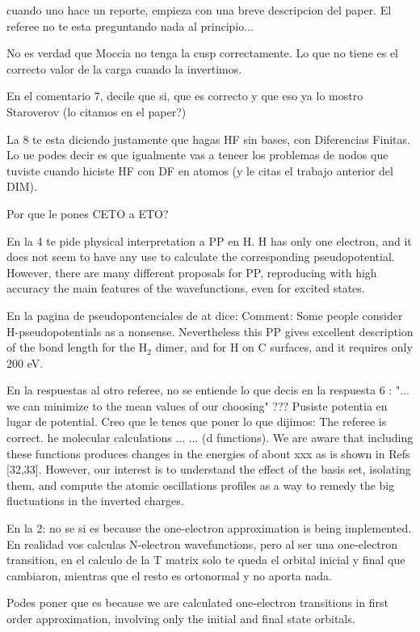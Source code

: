 cuando uno hace un reporte, empieza con una breve descripcion del paper.
El referee no te esta preguntando nada al principio...

No es verdad que Moccia no tenga la cusp correctamente.
Lo que no tiene es el correcto valor de la carga cuando la invertimos.

En el comentario 7, decile que si, que es correcto y que eso ya lo
mostro Staroverov (lo citamos en el paper?)

La 8 te esta diciendo justamente que hagas HF sin bases,
con Diferencias Finitas. Lo ue podes decir es que igualmente
vas a teneer los problemas de nodos que tuviste cuando hiciste
HF con DF en atomos (y le citas el trabajo anterior del DIM).

Por que le pones CETO a ETO?

En la 4 te pide physical interpretation a PP en H.
H has only one electron, and it does not seem to have any use to
calculate the corresponding pseudopotential.
However, there are many different proposals for PP, reproducing
with high accuracy the main features of the wavefunctions, even
for excited states.

En la pagina de pseudopontenciales de at dice:
Comment:
Some people consider H-pseudopotentials as a nonsense. Nevertheless 
 this PP gives excellent description of the bond length for the H$ _2$ 
 dimer, and for H on C surfaces, and it requires only 200 eV.


En la respuestas al otro referee, no se entiende lo que decis en la
respuesta 6 : "... we can minimize to the mean values of our choosing" ???
Pusiste potentia en lugar de potential.
Creo que le tenes que poner lo que dijimos:
The referee is correct. he molecular calculations ...
... (d functions). We are aware that including these functions produces
changes in the energies of about xxx as is shown in Refs [32,33].
However, our interest is to understand the effect of the basis set,
isolating them, and compute the atomic oscillations profiles as a way to
remedy the big fluctuations in the inverted charges.




En la 2: no se si es because the one-electron approximation is being  
implemented.
En realidad vos calculas N-electron wavefunctions, pero al ser una  
one-electron
transition, en el calculo de la T matrix solo te queda el orbital 
 inicial y final
que cambiaron, mientras que el resto es ortonormal y no aporta nada.

Podes poner que es because we are calculated one-electron transitions in
first order approximation, involving only the initial and final state 
 orbitals.



